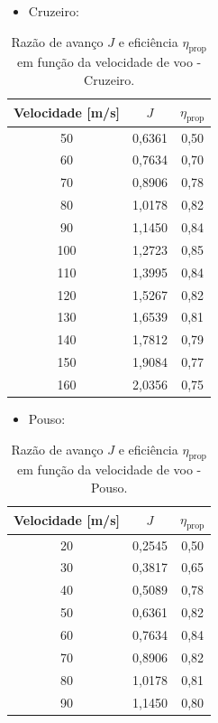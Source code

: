 \begin{itemize}
    \item{Cruzeiro:}
\end{itemize}

\begin{table}[H]
\centering
\caption{Razão de avanço $J$ e eficiência $\eta_{\mathrm{prop}}$ em função da velocidade de voo - Cruzeiro.}
\begin{tabular}{ccc}
\hline
Velocidade [m/s] & $J$ & $\eta_{\mathrm{prop}}$ \\
\hline
50 & 0{,}6361 & 0{,}50 \\
60 & 0{,}7634 & 0{,}70 \\
70 & 0{,}8906 & 0{,}78 \\
80 & 1{,}0178 & 0{,}82 \\
90 & 1{,}1450 & 0{,}84 \\
100 & 1{,}2723 & 0{,}85 \\
110 & 1{,}3995 & 0{,}84 \\
120 & 1{,}5267 & 0{,}82 \\
130 & 1{,}6539 & 0{,}81 \\
140 & 1{,}7812 & 0{,}79 \\
150 & 1{,}9084 & 0{,}77 \\
160 & 2{,}0356 & 0{,}75 \\
\hline
\end{tabular}
\end{table}

\clearpage
\begin{itemize}
    \item{Pouso:}
\end{itemize}

\begin{table}[H]
\centering
\caption{Razão de avanço $J$ e eficiência $\eta_{\mathrm{prop}}$ em função da velocidade de voo - Pouso.}
\begin{tabular}{ccc}
\hline
Velocidade [m/s] & $J$ & $\eta_{\mathrm{prop}}$ \\
\hline
20 & 0{,}2545 & 0{,}50 \\
30 & 0{,}3817 & 0{,}65 \\
40 & 0{,}5089 & 0{,}78 \\
50 & 0{,}6361 & 0{,}82 \\
60 & 0{,}7634 & 0{,}84 \\
70 & 0{,}8906 & 0{,}82 \\
80 & 1{,}0178 & 0{,}81 \\
90 & 1{,}1450 & 0{,}80 \\
\hline
\end{tabular}
\end{table}



